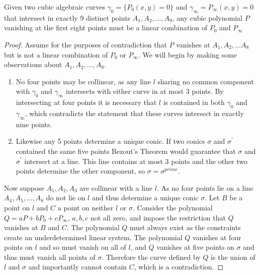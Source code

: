 \documentclass[
10pt, %
a4paper, %
oneside, %
headinclude,footinclude, %
BCOR5mm, %
]{scrartcl}
\begin{document}
\begin{theorem}
    Given two cubic algebraic curves \(\gamma_{0} = \{P_0(x, y) = 0\}\)  and \(\gamma_{\infty} = {P_\infty(x, y) = 0}\) that intersect in exactly 9 distinct points \(A_1, A_2, \ldots, A_9\), any cubic polynomial \(P\) vanishing at the first eight points must be a linear combination of \(P_{0}\) and \(P_{\infty}\)
\end{theorem}
\begin{proof}
    Assume for the purposes of contradiction that \(P\) vanishes at \(A_{1}, A_{2}, \ldots A_{8}\) but is not a linear combination of \(P_0\) or \(P_{\infty}\). We will begin by making some observations about \(A_{1}, A_{2}, \ldots, A_{9}\).

    \begin{enumerate}
        \item No four points may be collinear, as any line \(l\) sharing no common component with \(\gamma_{0}\) and \(\gamma_{\infty}\) intersects with either curve in at most 3 points. By intersecting at four points it is necessary that \(l\) is contained in both \(\gamma_{0}\) and \(\gamma_{\infty}\), which contradicts the statement that these curves intersect in exactly nine points.
        \item Likewise any 5 points determine a unique conic. If two conics \(\sigma\) and \(\sigma^{\prime}\) contained the same five points Bezout's Theorem would guarantee that \(\sigma\) and \(\sigma^{\prime}\) intersect at a line. This line contains at most 3 points and the other two points determine the other component, so \(\sigma = \sigma^{prime}\).
    \end{enumerate}

    Now suppose \(A_{1}, A_{2}, A_{3}\) are collinear with a line \(l\). As no four points lie on a line \(A_{4}, A_{5}, \ldots, A_{8}\) do not lie on \(l\) and thus determine a unique conic \(\sigma\). Let \(B\) be a point on \(l\) and \(C\) a point on neither \(l\) or \(\sigma\).
    Consider the polynomial \(Q = aP + bP_{0} + cP_{\infty}\), \(a, b, c\) not all zero, and impose the restriction that \(Q\) vanishes at \(B\) and \(C\). The polynomial \(Q\) must always exist as the constraints create an underdetermined linear system. The polynomial \(Q\) vanishes at four points on \(l\) and so must vanish on all of \(l\), and \(Q\) vanishes at five points on \(\sigma\) and thus must vanish
    all points of \(\sigma\). Therefore the curve defined by \(Q\) is the union of \(l\) and \(\sigma\) and importantly cannot contain \(C\), which is a contradiction.


\end{proof}
\end{document}
